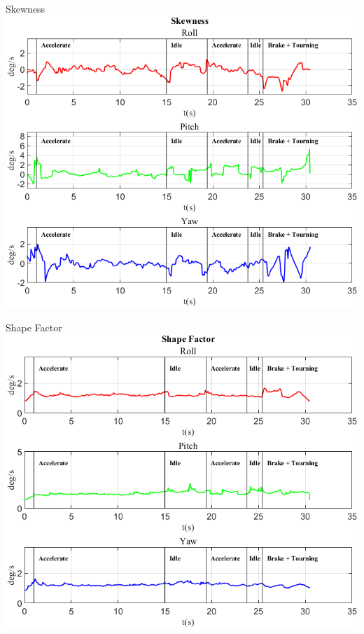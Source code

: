 \documentclass[beamer]{standalone}
\begin{document}
	\begin{frame}{{Skewness}}
		\centering\includegraphics[height=.8\textheight]{figure/VAng/Skewness}
	\end{frame}
	
	\begin{frame}{{Shape Factor}}
		\centering\includegraphics[height=.8\textheight]{figure/VAng/Shape Factor}
	\end{frame}
	
\end{document}
